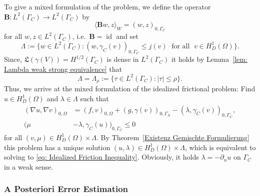 \documentclass[12pt,twoside,reqno]{amsart}
\theoremstyle{definition}
\numberwithin{equation}{section}
\renewcommand{\L}{\mathfrak{L}}
\newcommand{\B} {\bm{B}}
\begin{document}
            To give a mixed formulation of the problem, we define the operator $\B:L^2(\Gamma_C)\to L^2(\Gamma_C)$ by
            \begin{equation*}
                \langle\B w, z\rangle_W=(w,z)_{0,\Gamma_C}
            \end{equation*}
            for all $w,z \in L^2(\Gamma_C)$, i.e.~$\B=\operatorname{id}$ and set 
            \begin{equation*}%
                \Lambda:=\{w \in L^2(\Gamma_C): (w,\gamma_C(v))_{0,\Gamma_C}\leq j(v)\;\text{ for all }\; v\in H^1_D(\Omega)\}.
            \end{equation*}
            Since, $\L(\gamma(V))=H^{1/2}(\Gamma_C)$ is dense in $L^2(\Gamma_C)$ it holds by Lemma~\ref{lem: Lambda weak strong equivalence} that
            \begin{equation}\label{lem: Equivalent Lambda}
                    \Lambda =\Lambda_\rho:=\{\tau \in L^2(\Gamma_C): |\tau |\leq \rho\}.
                \end{equation}
            Thus, we arrive at the mixed formulation of the idealized frictional problem: Find $u\in H^1_D(\Omega)$ and $\lambda \in \Lambda$ such that
             \begin{subequations}\label{eq: Friction Mixed Formulation}
            \begin{align}
                (\nabla u, \nabla v)_{0,\Omega} &= (f,v)_{0,\Omega}+(g,\gamma(v))_{0,\Gamma_N}-(\lambda,\gamma_C(v))_{0,\Gamma_C}, \label{eq: Friction Mixed Formulation Teil1}  \\
                (\mu&-\lambda,\gamma_C(u))_{0,\Gamma_C}\leq 0
            \end{align}
            \end{subequations}
            for all $(v,\mu)\in H^1_D(\Omega) \times \Lambda$. By Theorem~\ref{Existenz Gemischte Formulierung} this problem has a unique solution $(u,\lambda)\in H^1_D(\Omega)\times \Lambda$, which is equivalent to solving to \eqref{eq: Idealized Friction Inequality}. Obviously, it holds $\lambda = -\partial_n u$ on $\Gamma_C$ in a weak sense.
  
            
            
 
        \subsubsection{A Posteriori Error Estimation} \label{sec:fric:apost}
\end{document}
